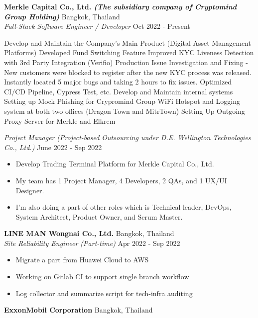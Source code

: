 \textbf{Merkle Capital Co., Ltd. \textit{\tiny{(The subsidiary company of Cryptomind Group Holding)}}} \hfill Bangkok, Thailand\\
\textit{Full-Stack Software Engineer / Developer} \hfill Oct 2022 - Present\\
\vspace{-1mm}
\begin{outline}
	\1 Develop and Maintain the Company's Main Product (Digital Asset Management Platforms)
		\2 Developed Fund Switching Feature
		\2 Improved KYC Liveness Detection with 3rd Party Integration (Verifio)
		\2 Production Issue Investigation and Fixing - New customers were blocked to register after the new KYC process was released. Instantly located 5 major bugs and taking 2 hours to fix issues.
		\2 Optimized CI/CD Pipeline, Cypress Test, etc.
	\1 Develop and Maintain internal systems
		\2 Setting up Mock Phishing for Crypromind Group
		\2 WiFi Hotspot and Logging system at both two offices (Dragon Town and MitrTown)
		\2 Setting Up Outgoing Proxy Server for Merkle and Elkrem
\end{outline}
\textit{Project Manager} \textit{\tiny (Project-based Outsourcing under D.E. Wellington Technologies Co., Ltd.)} \hfill June 2022 - Sep 2022\\
\vspace{-1mm}
\begin{itemize}
	\item Develop Trading Terminal Platform for Merkle Capital Co., Ltd.
	\item My team has 1 Project Manager, 4 Developers, 2 QAs, and 1 UX/UI Designer.
	\item I'm also doing a part of other roles which is Technical leader, DevOps, System Architect, Product Owner, and Scrum Master.
\end{itemize}
\textbf{LINE MAN Wongnai Co., Ltd.} \hfill Bangkok, Thailand\\
\textit{Site Reliability Engineer (Part-time)} \hfill Apr 2022 - Sep 2022\\
\vspace{-1mm}
\begin{itemize}
	\item Migrate a part from Huawei Cloud to AWS
	\item Working on Gitlab CI to support single branch workflow
	\item Log collector and summarize script for tech-infra auditing
\end{itemize}
\textbf{ExxonMobil Corporation} \hfill Bangkok, Thailand\\
